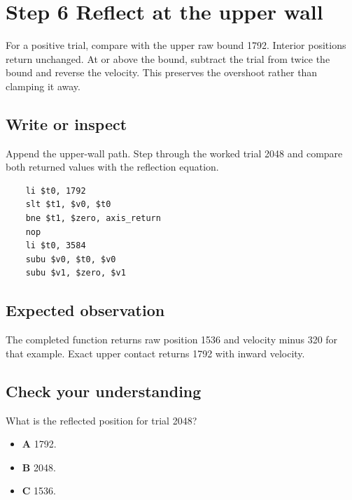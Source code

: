 \section{Step 6 Reflect at the upper wall}\label{ball-s06}

For a positive trial, compare with the upper raw bound 1792. Interior positions return unchanged. At or above the bound, subtract the trial from twice the bound and reverse the velocity. This preserves the overshoot rather than clamping it away.

\subsection{Write or inspect}
Append the upper-wall path. Step through the worked trial 2048 and compare both returned values with the reflection equation.

\begin{verbatim}
    li $t0, 1792
    slt $t1, $v0, $t0
    bne $t1, $zero, axis_return
    nop
    li $t0, 3584
    subu $v0, $t0, $v0
    subu $v1, $zero, $v1
\end{verbatim}

\subsection{Expected observation}
The completed function returns raw position 1536 and velocity minus 320 for that example. Exact upper contact returns 1792 with inward velocity.

\subsection{Check your understanding}
What is the reflected position for trial 2048?

\begin{itemize}
  \item \textbf{A} 1792.
  \item \textbf{B} 2048.
  \item \textbf{C} 1536.
\end{itemize}
